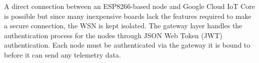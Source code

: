   A direct connection between an ESP8266-based node and Google Cloud IoT Core is possible but since many inexpensive boards lack the features required to make a secure connection, the WSN is kept isolated. The gateway layer handles the authentication process for the nodes through JSON Web Token (JWT) authentication. Each node must be authenticated via the gateway it is bound to before it can send any telemetry data.
